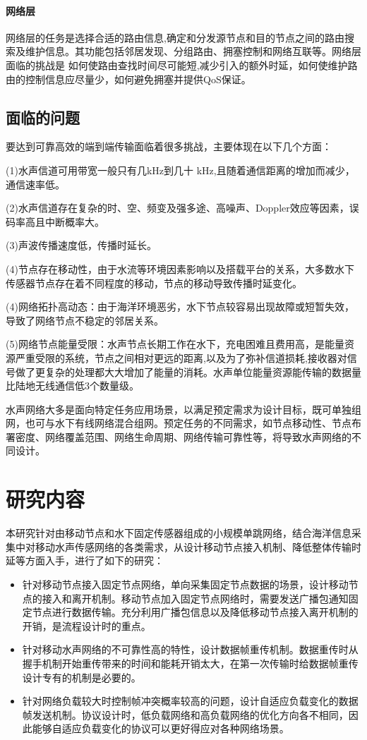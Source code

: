 \paragraph{网络层}
网络层的任务是选择合适的路由信息,确定和分发源节点和目的节点之间的路由搜索及维护信息。其功能包括邻居发现、分组路由、拥塞控制和网络互联等。网络层面临的挑战是
如何使路由查找时间尽可能短,减少引入的额外时延，如何使维护路由的控制信息应尽量少，如何避免拥塞并提供QoS保证。



\subsection{面临的问题}
要达到可靠高效的端到端传输面临着很多挑战，主要体现在以下几个方面：

(1)水声信道可用带宽一般只有几kHz到几十 kHz,且随着通信距离的增加而减少，通信速率低。

(2)水声信道存在复杂的时、空、频变及强多途、高噪声、Doppler效应等因素，误码率高且中断概率大。

(3)声波传播速度低，传播时延长。

(4)节点存在移动性，由于水流等环境因素影响以及搭载平台的关系，大多数水下传感器节点存在着不同程度的移动，节点的移动导致传播时延变化。

(4)网络拓扑高动态：由于海洋环境恶劣，水下节点较容易出现故障或短暂失效，导致了网络节点不稳定的邻居关系。

(5)网络节点能量受限：水声节点长期工作在水下，充电困难且费用高，是能量资源严重受限的系统，节点之间相对更远的距离,以及为了弥补信道损耗,接收器对信号做了更复杂的处理都大大增加了能量的消耗。水声单位能量资源能传输的数据量比陆地无线通信低3个数量级。

水声网络大多是面向特定任务应用场景，以满足预定需求为设计目标，既可单独组网，也可与水下有线网络混合组网。预定任务的不同需求，如节点移动性、节点布署密度、网络覆盖范围、网络生命周期、网络传输可靠性等，将导致水声网络的不同设计\cite{徐文2016海洋信息获取}。

\section{研究内容}
本研究针对由移动节点和水下固定传感器组成的小规模单跳网络，结合海洋信息采集中对移动水声传感网络的各类需求，从设计移动节点接入机制、降低整体传输时延等方面入手，进行了如下的研究：
\begin{itemize}
	\item 针对移动节点接入固定节点网络，单向采集固定节点数据的场景，设计移动节点的接入和离开机制。移动节点加入固定节点网络时，需要发送广播包通知固定节点进行数据传输。充分利用广播包信息以及降低移动节点接入离开机制的开销，是流程设计时的重点。
	\item 针对移动水声网络的不可靠性高的特性，设计数据帧重传机制。数据重传时从握手机制开始重传带来的时间和能耗开销太大，在第一次传输时给数据帧重传设计专有的机制是必要的。
	\item 针对网络负载较大时控制帧冲突概率较高的问题，设计自适应负载变化的数据帧发送机制。协议设计时，低负载网络和高负载网络的优化方向各不相同，因此能够自适应负载变化的协议可以更好得应对各种网络场景。
\end{itemize}

